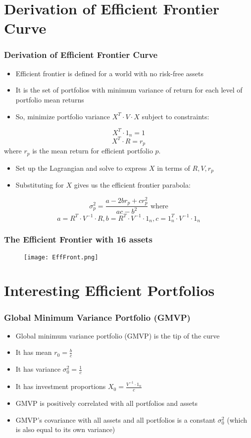 \documentclass{beamer}
\begin{document}
\section{Derivation of Efficient Frontier Curve}

\begin{frame}
\frametitle{Derivation of Efficient Frontier Curve}
\begin{itemize}
\item Efficient frontier is defined for a world with no risk-free assets
\item It is the set of portfolios with minimum variance of return for each level of portfolio mean returns
\item So, minimize portfolio variance $X^T \cdot V \cdot X$ subject to constraints:
\end{itemize}
$$X^T \cdot 1_n = 1$$
$$X^T \cdot R = r_p$$
where $r_p$ is the mean return for efficient portfolio $p$.
\begin{itemize}
\item Set up the Lagrangian and solve to express $X$ in terms of $R, V, r_p$ 
\item Substituting for $X$ gives us the efficient frontier parabola:
\end{itemize}
$$\sigma_p^2 = \frac {a - 2 b r_p + c r_p^2} {ac - b^2} \mbox{ where}$$
$$a = R^T \cdot V^{-1} \cdot R, b = R^T \cdot V^{-1} \cdot 1_n, c = 1_n^T \cdot V^{-1} \cdot 1_n$$
\end{frame}

\begin{frame}
\frametitle{The Efficient Frontier with 16 assets}
\begin{figure}
\texttt{[image: EffFront.png]}
\end{figure}
\end{frame}

\section{Interesting Efficient Portfolios}
\begin{frame}
\frametitle{Global Minimum Variance Portfolio (GMVP)}
\begin{itemize}
\item Global minimum variance portfolio (GMVP) is the tip of the curve
\item It has mean $r_0 = \frac b c$
\item It has variance $\sigma_0^2 = \frac 1 c$
\item It has investment proportions $X_0 = \frac {V^{-1} \cdot 1_n} c$
\item GMVP is positively correlated with all portfolios and assets
\item GMVP's covariance with all assets and all portfolios is a constant $\sigma_0^2$ (which is also equal to its own variance)
\end{itemize}
\end{frame}
\end{document}
